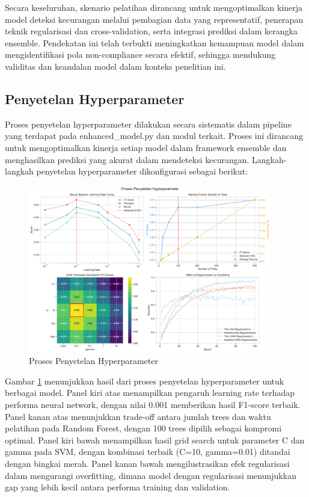 Secara keseluruhan, skenario pelatihan dirancang untuk mengoptimalkan kinerja model deteksi kecurangan melalui pembagian data yang representatif, penerapan teknik regularisasi dan cross-validation, serta integrasi prediksi dalam kerangka ensemble. Pendekatan ini telah terbukti meningkatkan kemampuan model dalam mengidentifikasi pola non-compliance secara efektif, sehingga mendukung validitas dan keandalan model dalam konteks penelitian ini.

\subsection{Penyetelan Hyperparameter}
\label{subsec:penyetelanHyperparameter}

Proses penyetelan hyperparameter dilakukan secara sistematis dalam pipeline yang terdapat pada enhanced\_model.py dan modul terkait. Proses ini dirancang untuk mengoptimalkan kinerja setiap model dalam framework ensemble dan menghasilkan prediksi yang akurat dalam mendeteksi kecurangan. Langkah-langkah penyetelan hyperparameter dikonfigurasi sebagai berikut:

\begin{figure}[htbp]
    \centering
    \includegraphics[width=0.95\textwidth]{figures/hyperparameter_tuning.pdf}
    \caption{Proses Penyetelan Hyperparameter}
    \label{fig:hyperparameter_tuning}
\end{figure}

Gambar \ref{fig:hyperparameter_tuning} menunjukkan hasil dari proses penyetelan hyperparameter untuk berbagai model. Panel kiri atas menampilkan pengaruh learning rate terhadap performa neural network, dengan nilai 0.001 memberikan hasil F1-score terbaik. Panel kanan atas menunjukkan trade-off antara jumlah trees dan waktu pelatihan pada Random Forest, dengan 100 trees dipilih sebagai kompromi optimal. Panel kiri bawah menampilkan hasil grid search untuk parameter C dan gamma pada SVM, dengan kombinasi terbaik (C=10, gamma=0.01) ditandai dengan bingkai merah. Panel kanan bawah mengilustrasikan efek regularisasi dalam mengurangi overfitting, dimana model dengan regularisasi menunjukkan gap yang lebih kecil antara performa training dan validation.

